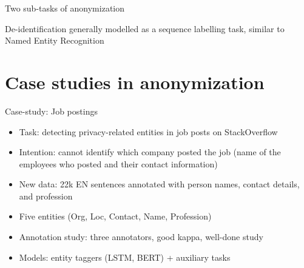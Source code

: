 \documentclass[12pt,aspectratio=169,handout]{beamer}
\begin{document}
\begin{frame}{Two sub-tasks of anonymization}

De-identification generally modelled as a sequence labelling task, similar to Named Entity Recognition


\end{frame}

\section{Case studies in anonymization}

\begin{frame}{Case-study: Job postings}

\begin{itemize}
\item Task: detecting privacy-related entities in job posts on StackOverflow
\item Intention: cannot identify which company posted the job (name of the employees who posted and their contact information)
\item New data: 22k EN sentences annotated with person names, contact details, and profession
\item Five entities (Org, Loc, Contact, Name, Profession)
\item Annotation study: three annotators, good kappa, well-done study
\item Models: entity taggers (LSTM, BERT) + auxiliary tasks
\end{itemize}


\end{frame}
\end{document}

